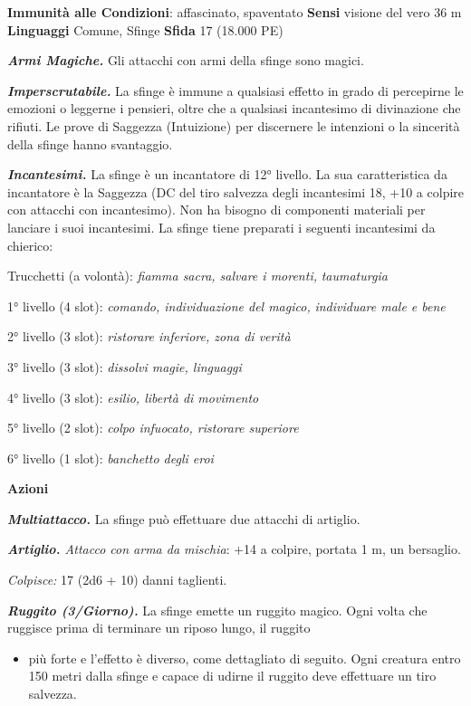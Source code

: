 \begin{multicols}{2}
\textbf{Immunità alle Condizioni}: affascinato, spaventato \textbf{Sensi}
visione del vero 36 m \textbf{Linguaggi} Comune,
Sfinge \textbf{Sfida} 17 (18.000 PE)\smallskip

\emph{\textbf{Armi Magiche.}} Gli attacchi con armi della sfinge sono
magici.

\emph{\textbf{Imperscrutabile.}} La sfinge è immune a qualsiasi effetto
in grado di percepirne le emozioni o leggerne i pensieri, oltre che a
qualsiasi incantesimo di divinazione che rifiuti. Le prove di Saggezza
(Intuizione) per discernere le intenzioni o la sincerità della sfinge
hanno svantaggio.

\emph{\textbf{Incantesimi.}} La sfinge è un incantatore di 12° livello.
La sua caratteristica da incantatore è la Saggezza (DC del tiro salvezza
degli incantesimi 18, +10 a colpire con attacchi con incantesimo). Non
ha bisogno di componenti materiali per lanciare i suoi incantesimi. La
sfinge tiene preparati i seguenti incantesimi da chierico:

Trucchetti (a volontà): \emph{fiamma sacra, salvare i morenti,}
\emph{taumaturgia}

1° livello (4 slot): \emph{comando, individuazione del magico,}
\emph{individuare male e bene}

2° livello (3 slot): \emph{ristorare inferiore, zona di verità}

3° livello (3 slot): \emph{dissolvi magie, linguaggi}

4° livello (3 slot): \emph{esilio, libertà di movimento}

5° livello (2 slot): \emph{colpo infuocato, ristorare superiore}

6° livello (1 slot): \emph{banchetto degli eroi}


\smallskip\textbf{Azioni}

\emph{\textbf{Multiattacco.}} La sfinge può effettuare due attacchi di
artiglio.

\emph{\textbf{Artiglio.} Attacco con arma da mischia}: +14 a colpire,
portata 1 m, un bersaglio.

\emph{Colpisce:} 17 (2d6 + 10) danni taglienti.

\emph{\textbf{Ruggito (3/Giorno).}} La sfinge emette un ruggito magico.
Ogni volta che ruggisce prima di terminare un riposo lungo, il ruggito


\begin{itemize}
\item
  più forte e l'effetto è diverso, come dettagliato di seguito. Ogni
  creatura entro 150 metri dalla sfinge e capace di udirne il ruggito
  deve effettuare un tiro salvezza.
\end{itemize}



\end{multicols}
